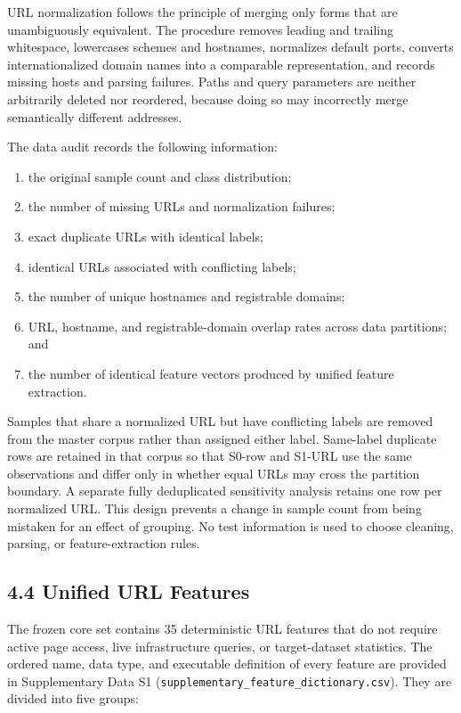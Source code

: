 \documentclass[
  10pt,
]{article}
\providecommand{\tightlist}{%
  \setlength{\itemsep}{0pt}\setlength{\parskip}{0pt}}
\begin{document}
URL normalization follows the principle of merging only forms that are
unambiguously equivalent. The procedure removes leading and trailing
whitespace, lowercases schemes and hostnames, normalizes default ports,
converts internationalized domain names into a comparable
representation, and records missing hosts and parsing failures. Paths
and query parameters are neither arbitrarily deleted nor reordered,
because doing so may incorrectly merge semantically different addresses.

The data audit records the following information:

\begin{enumerate}
\def\labelenumi{\arabic{enumi}.}
\tightlist
\item
  the original sample count and class distribution;
\item
  the number of missing URLs and normalization failures;
\item
  exact duplicate URLs with identical labels;
\item
  identical URLs associated with conflicting labels;
\item
  the number of unique hostnames and registrable domains;
\item
  URL, hostname, and registrable-domain overlap rates across data
  partitions; and
\item
  the number of identical feature vectors produced by unified feature
  extraction.
\end{enumerate}

Samples that share a normalized URL but have conflicting labels are
removed from the master corpus rather than assigned either label.
Same-label duplicate rows are retained in that corpus so that S0-row and
S1-URL use the same observations and differ only in whether equal URLs
may cross the partition boundary. A separate fully deduplicated
sensitivity analysis retains one row per normalized URL. This design
prevents a change in sample count from being mistaken for an effect of
grouping. No test information is used to choose cleaning, parsing, or
feature-extraction rules.

\subsection{4.4 Unified URL Features}\label{unified-url-features}

The frozen core set contains 35 deterministic URL features that do not
require active page access, live infrastructure queries, or
target-dataset statistics. The ordered name, data type, and executable
definition of every feature are provided in Supplementary Data S1
(\texttt{supplementary\_feature\_dictionary.csv}). They are divided into
five groups:
\end{document}
